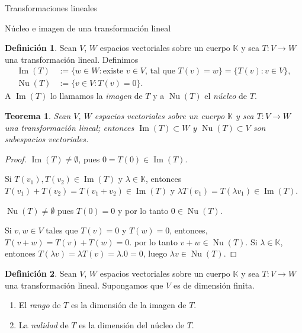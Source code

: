 \documentclass[a4paper,12pt,twoside,spanish,reqno]{amsbook}
\newtheorem{teorema}{Teorema}[section]
\theoremstyle{definition}
\newtheorem{definicion}{Definici\'on}[section]
\theoremstyle{remark}
\newcommand{\img}{\operatorname{Im}}
\newcommand{\nuc}{\operatorname{Nu}}
\newcommand{\K}{\mathbb K}
\begin{document}
\begin{chapter}{Transformaciones lineales}
\begin{section}{Núcleo e imagen de una transformación lineal}
		\begin{definicion}
			Sean $V$, $W$ espacios vectoriales sobre un cuerpo $\K$ y sea $T:V \to W$ una transformación lineal.  Definimos
			\begin{align*}
				\img(T) &:= \{w \in W:\text{existe $v \in V$, tal que } T(v)=w\} = \{T(v): v \in V \}, \\
				\nuc(T) &:= \{v \in V: T(v)=0 \}. 
			\end{align*}
			A $\img(T)$ lo llamamos la \textit{imagen} de $T$ y a $ \nuc(T)$ el \textit{núcleo} de $T$. 
		\end{definicion}
		
		\begin{teorema}
			Sean $V$, $W$ espacios vectoriales sobre un cuerpo $\K$ y sea $T:V \to W$ una transformación lineal; entonces $\img(T) \subset W$ y $\nuc(T) \subset V$ son subespacios vectoriales.
		\end{teorema}
		\begin{proof}
			$\img(T) \ne \emptyset$, pues $0 = T(0) \in \img(T)$. 
			
			Si $T(v_1),T(v_2) \in \img(T)$ y $\lambda \in \K$,  entonces $T(v_1) + T(v_2) = T(v_1+v_2) \in \img(T)$ y $\lambda T(v_1) = T(\lambda v_1) \in \img(T)$.
			
			
			$\nuc(T) \ne \emptyset$ pues $T(0) =0$ y por lo tanto $0 \in \nuc(T)$.
			
			Si $v,w \in V$ tales que $T(v) =0$ y $T(w)=0$,  entonces, $T(v+w)= T(v)+T(w) =0$. por lo tanto $v+w \in \nuc(T)$. Si  $\lambda \in \K$,  entonces $T(\lambda v) = \lambda T(v) = \lambda.0 =0$, luego  $\lambda v \in \nuc(T)$.
		\end{proof}

	
		\begin{definicion}
			Sean $V$, $W$ espacios vectoriales sobre un cuerpo $\K$ y sea $T:V \to W$ una transformación lineal. Supongamos que $V$ es de dimensión finita.
			\begin{enumerate}
\item El \textit{rango} de $T$ es la dimensión de la imagen de $T$.
\item La \textit{nulidad} de $T$ es la dimensión del núcleo  de $T$.
			\end{enumerate}
			
		\end{definicion}
				

\end{section}
\end{chapter}
\end{document}
